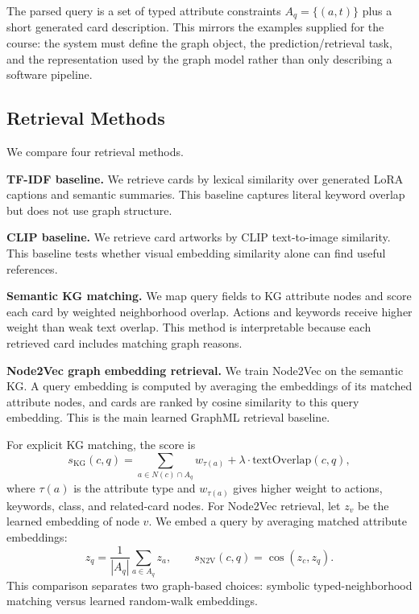 \documentclass{article}
\begin{document}
The parsed query is a set of typed attribute constraints $A_q=\{(a,t)\}$ plus a short generated card description. This mirrors the examples supplied for the course: the system must define the graph object, the prediction/retrieval task, and the representation used by the graph model rather than only describing a software pipeline.

\subsection{Retrieval Methods}

We compare four retrieval methods.

\textbf{TF-IDF baseline.} We retrieve cards by lexical similarity over generated LoRA captions and semantic summaries. This baseline captures literal keyword overlap but does not use graph structure.

\textbf{CLIP baseline.} We retrieve card artworks by CLIP text-to-image similarity. This baseline tests whether visual embedding similarity alone can find useful references.

\textbf{Semantic KG matching.} We map query fields to KG attribute nodes and score each card by weighted neighborhood overlap. Actions and keywords receive higher weight than weak text overlap. This method is interpretable because each retrieved card includes matching graph reasons.

\textbf{Node2Vec graph embedding retrieval.} We train Node2Vec on the semantic KG. A query embedding is computed by averaging the embeddings of its matched attribute nodes, and cards are ranked by cosine similarity to this query embedding. This is the main learned GraphML retrieval baseline.

For explicit KG matching, the score is
\begin{equation}
s_{\mathrm{KG}}(c,q)=\sum_{a \in N(c) \cap A_q} w_{\tau(a)}+\lambda \cdot \mathrm{textOverlap}(c,q),
\end{equation}
where $\tau(a)$ is the attribute type and $w_{\tau(a)}$ gives higher weight to actions, keywords, class, and related-card nodes. For Node2Vec retrieval, let $z_v$ be the learned embedding of node $v$. We embed a query by averaging matched attribute embeddings:
\begin{equation}
z_q = \frac{1}{|A_q|}\sum_{a \in A_q} z_a,\qquad
s_{\mathrm{N2V}}(c,q)=\cos(z_c,z_q).
\end{equation}
This comparison separates two graph-based choices: symbolic typed-neighborhood matching versus learned random-walk embeddings.
\end{document}
